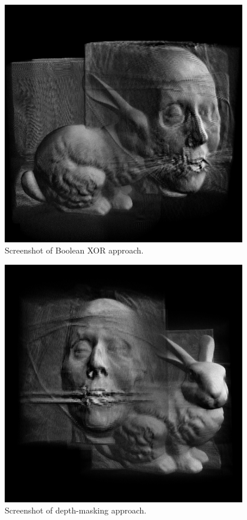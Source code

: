 \documentclass{report}
\begin{document}
\begin{figure}
\centering
\includegraphics[width=0.95\textwidth]{boolean-xor-screenshot.png}
\caption{Screenshot of Boolean XOR approach.}
\end{figure}

\begin{figure}
\centering
\includegraphics[width=0.95\textwidth]{boolean-and-screenshot.png}
\caption{Screenshot of depth-masking approach.}
\end{figure}
\end{document}
